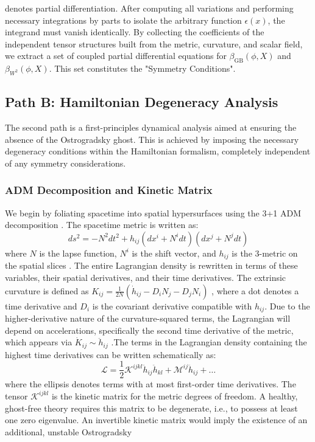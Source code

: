 \documentclass[twocolumn]{aastex631}
\begin{document}
denotes partial differentiation. After computing all variations and performing necessary integrations by parts to isolate the arbitrary function $\epsilon(x)$, the integrand must vanish identically. By collecting the coefficients of the independent tensor structures built from the metric, curvature, and scalar field, we extract a set of coupled partial differential equations for $\beta_{\text{GB}}(\phi, X)$ and $\beta_{W^2}(\phi, X)$. This set constitutes the "Symmetry Conditions".\subsection{Path B: Hamiltonian Degeneracy Analysis}The second path is a first-principles dynamical analysis aimed at ensuring the absence of the Ostrogradsky ghost. This is achieved by imposing the necessary degeneracy conditions within the Hamiltonian formalism, completely independent of any symmetry considerations. \citep{motohashi2016healthydegeneratetheorieshigher,svanberg2022theorieshigherordertimederivatives}\subsubsection{ADM Decomposition and Kinetic Matrix}We begin by foliating spacetime into spatial hypersurfaces using the 3+1 ADM decomposition \citep{gourgoulhon200731formalismbasesnumerical,corichi2023introductionadmformalism}. The spacetime metric is written as: \citep{corichi2023introductionadmformalism}\begin{equation}ds^2 = -N^2 dt^2 + h_{ij}(dx^i + N^i dt)(dx^j + N^j dt)\end{equation}where $N$ is the lapse function, $N^i$ is the shift vector, and $h_{ij}$ is the 3-metric on the spatial slices \citep{brewin1997adm31formulationsmooth,bajardi2024primaryconstraintsgeneralteleparallel,vinckers2024numericalsolutionsfrkleingordon}. The entire Lagrangian density is rewritten in terms of these variables, their spatial derivatives, and their time derivatives. The extrinsic curvature is defined as $K_{ij} = \frac{1}{2N}(\dot{h}_{ij} - D_i N_j - D_j N_i)$ \citep{vinckers2024numericalsolutionsfrkleingordon}, where a dot denotes a time derivative and $D_i$ is the covariant derivative compatible with $h_{ij}$. Due to the higher-derivative nature of the curvature-squared terms, the Lagrangian will depend on accelerations, specifically the second time derivative of the metric, which appears via $\dot{K}_{ij} \sim \ddot{h}_{ij}$ \citep{brown2011generalizedharmonicequations31}.The terms in the Lagrangian density containing the highest time derivatives can be written schematically as:\begin{equation}\mathcal{L} = \frac{1}{2} \mathcal{K}^{ijkl} \ddot{h}_{ij} \ddot{h}_{kl} + \mathcal{M}^{ij} \ddot{h}_{ij} + \dots\end{equation}where the ellipsis denotes terms with at most first-order time derivatives. The tensor $\mathcal{K}^{ijkl}$ is the kinetic matrix for the metric degrees of freedom. A healthy, ghost-free theory requires this matrix to be degenerate, i.e., to possess at least one zero eigenvalue. An invertible kinetic matrix would imply the existence of an additional, unstable Ostrogradsky 
\end{document}
